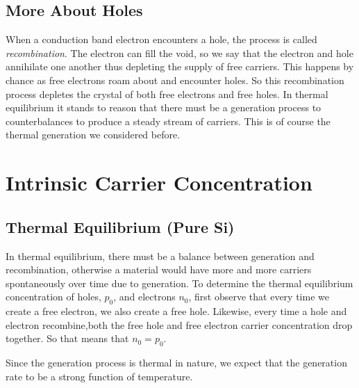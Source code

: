 \subsection{More About Holes}
When a conduction band electron encounters a hole, the process is called \textit{recombination}.  The electron can fill the void, so we say that the electron and hole annihilate one another thus depleting the supply of free carriers.  This happens by chance as free electrons roam about and encounter holes.  So this recombination process depletes the crystal of both free electrons and free holes.  In thermal equilibrium it stands to reason that there must be a generation process to counterbalances to produce a steady stream of carriers.  This is of course the thermal generation we considered before.
\section{Intrinsic Carrier Concentration}
\subsection{Thermal Equilibrium (Pure Si)}
In thermal equilibrium, there must be a balance between generation and recombination, otherwise a material would have more and more carriers spontaneously over time due to generation.  To determine the thermal equilibrium concentration of holes, $p_0$, and electrons $n_0$, first observe that  every time we create a free electron, we also create a free hole.  Likewise, every time a hole and electron recombine,both the free hole and free electron carrier concentration drop together.  So that means that $n_0 =  p_0 $.

Since the generation process is thermal in nature, we expect that the generation rate to be a strong function of temperature.

